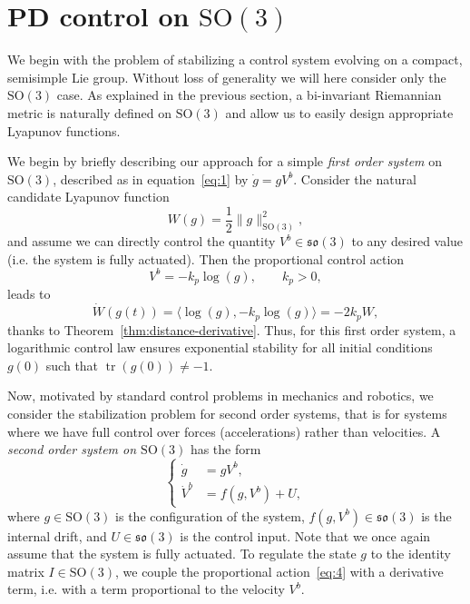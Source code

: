 \documentclass[10pt,twocolumn]{article}
\newcommand{\SO}{\mathrm{SO}}
\newcommand{\so}{\mathfrak{so}}
\newcommand{\tr}{\operatorname{tr}}
\begin{document}
\section{PD control on $\SO(3)$}\label{sec:pd-so3}
We begin with the problem of stabilizing a control system evolving on a compact, semisimple Lie group. Without loss of generality we will here consider only the $\SO(3)$ case. As explained in the previous section, a bi-invariant Riemannian metric is naturally defined on $\SO(3)$ and allow us to easily design appropriate Lyapunov functions.


We begin by briefly describing our approach for a simple \emph{first order system} on $\SO(3)$, described as in equation~\eqref{eq:1} by $\dot g=gV^b$. Consider the natural candidate Lyapunov function
\begin{equation*}
W(g)=\frac12\|g\|_{\SO(3)}^2,
\end{equation*}
and assume we can directly control the quantity $V^b\in\so(3)$ to any desired value (i.e. the system is fully actuated). Then the proportional control action
\begin{equation*}
V^b=-k_p\log(g),\qquad k_p>0,\tag{4}\label{eq:4}
\end{equation*}
leads to
\begin{equation*}
\dot W(g(t))=\langle\log(g),-k_p\log(g)\rangle=-2k_pW,
\end{equation*}
thanks to Theorem~\ref{thm:distance-derivative}. Thus, for this first order system, a logarithmic control law ensures exponential stability for all initial conditions $g(0)$ such that $\tr(g(0))\neq-1$.

Now, motivated by standard control problems in mechanics and robotics, we consider the stabilization problem for second order systems, that is for systems where we have full control over forces (accelerations) rather than velocities. A \emph{second order system on $\SO(3)$} has the form
\begin{equation*}
\left\{\begin{aligned}
\dot g&=gV^b,\\
\dot V^b&=f(g,V^b)+U,
\end{aligned}\right.\tag{5}\label{eq:5}
\end{equation*}
where $g\in\SO(3)$ is the configuration of the system, $f(g,V^b)\in\so(3)$ is the internal drift, and $U\in\so(3)$ is the control input. Note that we once again assume that the system is fully actuated. To regulate the state $g$ to the identity matrix $I\in\SO(3)$, we couple the proportional action~\eqref{eq:4} with a derivative term, i.e. with a term proportional to the velocity $V^b$.
\end{document}
